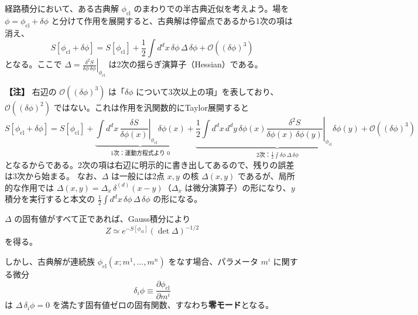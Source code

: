 \documentclass[uplatex, dvipdfmx, book]{jsbook}
\newenvironment{note}{\vspace{1ex}\par\footnotesize\noindent\textbf{【注】}}{\par\vspace{1ex}}
\begin{document}
経路積分において、ある古典解 $\phi_{\text{cl}}$ のまわりでの半古典近似を考えよう。場を $\phi = \phi_{\text{cl}} + \delta\phi$ と分けて作用を展開すると、古典解は停留点であるから1次の項は消え、
\begin{equation}
    S[\phi_{\text{cl}} + \delta\phi] = S[\phi_{\text{cl}}] + \frac{1}{2}\int d^dx\, \delta\phi\, \Delta\, \delta\phi + \mathcal{O}((\delta\phi)^3)
\end{equation}
となる。ここで $\Delta = \left.\frac{\delta^2 S}{\delta\phi\,\delta\phi}\right|_{\phi_{\text{cl}}}$ は2次の揺らぎ演算子（Hessian）である。
\begin{note}
    右辺の $\mathcal{O}((\delta\phi)^3)$ は「$\delta\phi$ について3次以上の項」を表しており、$\mathcal{O}((\delta\phi)^2)$ ではない。これは作用を汎関数的にTaylor展開すると
    \begin{equation}
        S[\phi_{\text{cl}} + \delta\phi]
        = S[\phi_{\text{cl}}]
        + \underbrace{\int d^dx\,\left.\frac{\delta S}{\delta\phi(x)}\right|_{\phi_{\text{cl}}}\delta\phi(x)}_{\text{1次：運動方程式より }0}
        + \underbrace{\frac{1}{2}\int d^dx\,d^dy\,\delta\phi(x)\left.\frac{\delta^2 S}{\delta\phi(x)\,\delta\phi(y)}\right|_{\phi_{\text{cl}}}\delta\phi(y)}_{\text{2次：}\frac{1}{2}\int\delta\phi\,\Delta\,\delta\phi}
        + \mathcal{O}((\delta\phi)^3)
    \end{equation}
    となるからである。2次の項は右辺に明示的に書き出してあるので、残りの誤差は3次から始まる。
    なお、$\Delta$ は一般には2点 $x,y$ の核 $\Delta(x,y)$ であるが、局所的な作用では $\Delta(x,y)=\Delta_x\,\delta^{(d)}(x-y)$（$\Delta_x$ は微分演算子）の形になり、$y$ 積分を実行すると本文の $\frac{1}{2}\int d^dx\,\delta\phi\,\Delta\,\delta\phi$ の形になる。
\end{note}
$\Delta$ の固有値がすべて正であれば、Gauss積分により
\begin{equation}
    Z \simeq e^{-S[\phi_{\text{cl}}]} \left(\det \Delta\right)^{-1/2}
\end{equation}
を得る。

しかし、古典解が連続族 $\phi_{\text{cl}}(x; m^1, \dots, m^n)$ をなす場合、パラメータ $m^i$ に関する微分
\begin{equation}
    \delta_i \phi \equiv \frac{\partial \phi_{\text{cl}}}{\partial m^i}
\end{equation}
は $\Delta\,\delta_i\phi = 0$ を満たす固有値ゼロの固有関数、すなわち\textbf{零モード}となる。
\end{document}
